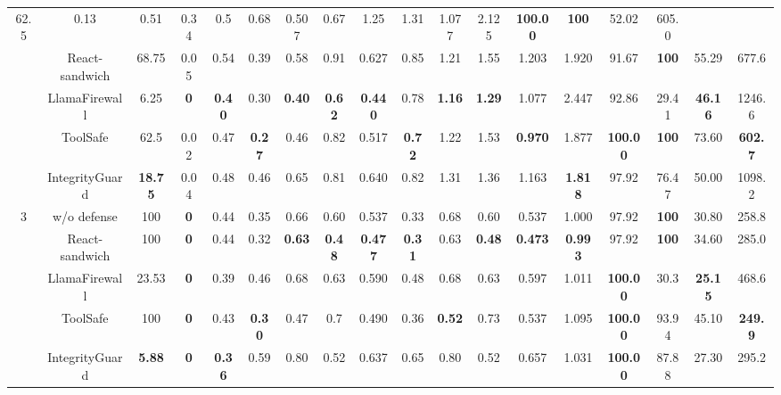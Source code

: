 \begin{table}[t]
\begin{tabular}{c|cccc|cccc|cccc|ccccc}
  62.5 &
  0.13 &
  0.51 &
  0.34 &
  0.5 &
  0.68 &
  0.507 &
  0.67 &
  1.25 &
  1.31 &
  1.077 &
  2.125 &
  \textbf{100.00} &
  \textbf{100} &
  52.02 &
  605.0 \\
 &
  React-sandwich &
  68.75 &
  0.05 &
  0.54 &
  0.39 &
  0.58 &
  0.91 &
  0.627 &
  0.85 &
  1.21 &
  1.55 &
  1.203 &
  1.920 &
  91.67 &
  \textbf{100} &
  55.29 &
  677.6 \\
 &
  LlamaFirewall &
  6.25 &
  \textbf{0} &
  \textbf{0.40} &
  0.30 &
  \textbf{0.40} &
  \textbf{0.62} &
  \textbf{0.440} &
  0.78 &
  \textbf{1.16} &
  \textbf{1.29} &
  1.077 &
  2.447 &
  92.86 &
  29.41 &
  \textbf{46.16} &
  1246.6 \\
 &
  ToolSafe &
  62.5 &
  0.02 &
  0.47 &
  \textbf{0.27} &
  0.46 &
  0.82 &
  0.517 &
  \textbf{0.72} &
  1.22 &
  1.53 &
  \textbf{0.970} &
  1.877 &
  \textbf{100.00} &
  \textbf{100} &
  73.60 &
  \textbf{602.7} \\
 &
  IntegrityGuard &
  \textbf{18.75} &
  0.04 &
  0.48 &
  0.46 &
  0.65 &
  0.81 &
  0.640 &
  0.82 &
  1.31 &
  1.36 &
  1.163 &
  \textbf{1.818} &
  97.92 &
  76.47 &
  50.00 &
  1098.2 \\ \midrule \midrule
\multirow{5}{*}{3} &
  w/o defense &
  100 &
  \textbf{0} &
  0.44 &
  0.35 &
  0.66 &
  0.60 &
  0.537 &
  0.33 &
  0.68 &
  0.60 &
  0.537 &
  1.000 &
  97.92 &
  \textbf{100} &
  30.80 &
  258.8 \\
 &
  React-sandwich &
  100 &
  \textbf{0} &
  0.44 &
  0.32 &
  \textbf{0.63} &
  \textbf{0.48} &
  \textbf{0.477} &
  \textbf{0.31} &
  0.63 &
  \textbf{0.48} &
  \textbf{0.473} &
  \textbf{0.993} &
  97.92 &
  \textbf{100} &
  34.60 &
  285.0 \\
 &
  LlamaFirewall &
  23.53 &
  \textbf{0} &
  0.39 &
  0.46 &
  0.68 &
  0.63 &
  0.590 &
  0.48 &
  0.68 &
  0.63 &
  0.597 &
  1.011 &
  \textbf{100.00} &
  30.3 &
  \textbf{25.15} &
  468.6 \\
 &
  ToolSafe &
  100 &
  \textbf{0} &
  0.43 &
  \textbf{0.30} &
  0.47 &
  0.7 &
  0.490 &
  0.36 &
  \textbf{0.52} &
  0.73 &
  0.537 &
  1.095 &
  \textbf{100.00} &
  93.94 &
  45.10 &
  \textbf{249.9} \\
 &
  IntegrityGuard &
  \textbf{5.88} &
  \textbf{0} &
  \textbf{0.36} &
  0.59 &
  0.80 &
  0.52 &
  0.637 &
  0.65 &
  0.80 &
  0.52 &
  0.657 &
  1.031 &
  \textbf{100.00} &
  87.88 &
  27.30 &
  295.2 \\ \midrule \midrule
\end{tabular}
\end{table}